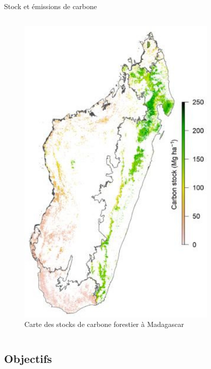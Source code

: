 \documentclass[10pt,table,dvipsnames,compress]{beamer}
\begin{document}
\begin{frame}[label={sec:org0a20960}]{Stock et émissions de carbone}
\begin{columns}
\begin{column}{0.4\columnwidth}
\begin{figure}[htbp]
\centering
\includegraphics[width=0.85\textwidth]{figs/Cstock_Mada.jpg}
\caption{Carte des stocks de carbone forestier à Madagascar}
\end{figure}
\end{column}
\end{columns}
\end{frame}

\subsection{Objectifs}
\label{sec:orgd5c91f2}
\end{document}
